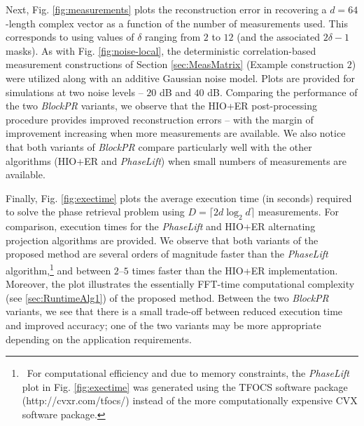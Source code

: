 Next, Fig. \ref{fig:measurements} plots the reconstruction error in recovering a $d=64$-length
complex vector as a function of the number of measurements used. This corresponds to using values of
$\delta$ ranging from $2$ to $12$ (and the associated $2\delta-1$ masks). As with Fig.
\ref{fig:noise-local}, the deterministic correlation-based measurement constructions of Section
\ref{sec:MeasMatrix} (Example construction $2$) were utilized along with an additive Gaussian noise
model. Plots are provided for simulations at two noise levels -- $20$ dB and $40$ dB. 
Comparing the performance of the two {\em BlockPR} variants, we observe that the HIO+ER post-processing 
procedure provides improved reconstruction errors -- with the margin of improvement increasing when 
more measurements are available. We also notice that both variants of {\em BlockPR} compare
particularly well with the other algorithms (HIO+ER and {\em PhaseLift}) when small numbers of measurements are available.

Finally, Fig. \ref{fig:exectime} plots the average execution time (in seconds) required to solve the
phase retrieval problem using $D = \lceil 2d\log_2d\rceil$ measurements. For comparison, execution
times for the {\em PhaseLift} and HIO+ER alternating projection algorithms are provided. We observe
that both variants of the proposed method are several orders of magnitude faster than the {\em
PhaseLift} algorithm,\footnote{\ For computational efficiency and due to memory constraints, the {\em
PhaseLift} plot in Fig. \ref{fig:exectime} was generated using the TFOCS software package
(http://cvxr.com/tfocs/) instead of the more computationally expensive CVX software package.} and between
$2$--$5$ times faster than the HIO+ER implementation. Moreover, the plot illustrates the essentially
FFT-time computational complexity (see \cref{sec:RuntimeAlg1}) of the proposed method. Between the
two {\em BlockPR} variants, we see that there is a small trade-off between reduced execution time and
improved accuracy; one of the two variants may be more appropriate depending on the application
requirements.

